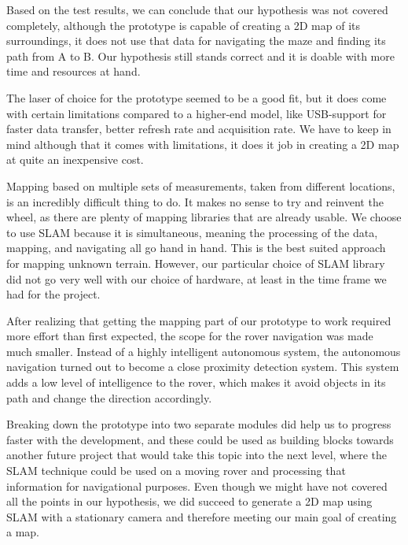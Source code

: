 Based on the test results, we can conclude that our hypothesis was not covered completely, although the prototype is capable of creating a 2D map of its surroundings, it does not use that data for navigating the maze and finding its path from A to B. Our hypothesis still stands correct and it is doable with more time and resources at hand.

The laser of choice for the prototype seemed to be a good fit, but it does come with certain limitations compared to a higher-end model, like USB-support for faster data transfer, better refresh rate and acquisition rate. We have to keep in mind although that it comes with limitations, it does it job in creating a 2D map at quite an inexpensive cost.

Mapping based on multiple sets of measurements, taken from different locations, is an incredibly difficult thing to do. It makes no sense to try and reinvent the wheel, as there are plenty of mapping libraries that are already usable. We choose to use SLAM because it is simultaneous, meaning the processing of the data, mapping, and navigating all go hand in hand. This is the best suited approach for mapping unknown terrain. However, our particular choice of SLAM library did not go very well with our choice of hardware, at least in the time frame we had for the project.

After realizing that getting the mapping part of our prototype to work required more effort than first expected, the scope for the rover navigation was made much smaller. Instead of a highly intelligent autonomous system, the autonomous navigation turned out to become a close proximity detection system. This system adds a low level of intelligence to the rover, which makes it avoid objects in its path and change the direction accordingly.
 
Breaking down the prototype into two separate modules did help us to progress faster with the development, and these could be used as building blocks towards another future project that would take this topic into the next level, where the SLAM technique could be used on a moving rover and processing that information for navigational purposes. Even though we might have not covered all the points in our hypothesis, we did succeed to generate a 2D map using SLAM with a stationary camera and therefore meeting our main goal of creating a map. 